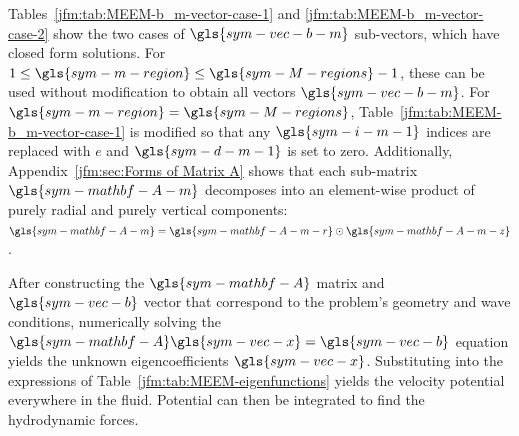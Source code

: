 \documentclass[ASNA,twocolumn]{USG} %
\begin{document}
Tables~\ref{jfm:tab:MEEM-b_m-vector-case-1} and \ref{jfm:tab:MEEM-b_m-vector-case-2} 
show the two cases of $\gls{sym-vec-b-m}$ sub-vectors, which have closed form solutions.
For $1 \le \gls{sym-m-region} \le \gls{sym-M-regions}-1$, these can be used without modification to obtain all vectors $\gls{sym-vec-b-m}$.
For $\gls{sym-m-region}=\gls{sym-M-regions}$, Table~\ref{jfm:tab:MEEM-b_m-vector-case-1} is modified so that any $\gls{sym-i-m-1}$ indices are replaced with $e$ and $\gls{sym-d-m-1}$ is set to zero. 
Additionally, Appendix~\ref{jfm:sec:Forms of Matrix A} shows that each sub-matrix $\gls{sym-mathbf-A-m}$ decomposes into an element-wise product of purely radial and purely vertical components:
$\gls{sym-mathbf-A-m} = \gls{sym-mathbf-A-m-r} \odot \gls{sym-mathbf-A-m-z}$.

After constructing the $\gls{sym-mathbf-A}$ matrix and $\gls{sym-vec-b}$ vector 
that correspond to the problem's geometry and wave conditions, 
numerically solving the $\gls{sym-mathbf-A} \gls{sym-vec-x}=\gls{sym-vec-b}$ 
equation yields the unknown eigencoefficients $\gls{sym-vec-x}$.
Substituting into the expressions of Table~\ref{jfm:tab:MEEM-eigenfunctions} 
yields the velocity potential everywhere in the fluid.
Potential can then be integrated to find the hydrodynamic forces.
\end{document}
